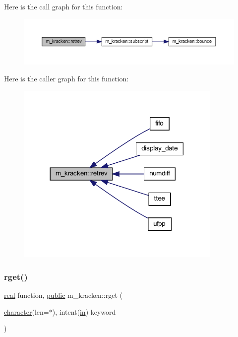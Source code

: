 Here is the call graph for this function\+:
\nopagebreak
\begin{figure}[H]
\begin{center}
\leavevmode
\includegraphics[width=350pt]{namespacem__kracken_ad4f3d7c793c90789b175097b433035da_cgraph}
\end{center}
\end{figure}
Here is the caller graph for this function\+:
\nopagebreak
\begin{figure}[H]
\begin{center}
\leavevmode
\includegraphics[width=281pt]{namespacem__kracken_ad4f3d7c793c90789b175097b433035da_icgraph}
\end{center}
\end{figure}
\mbox{\label{namespacem__kracken_a21e0e40932af79430832a53bdb4de300}} 
\subsubsection{\texorpdfstring{rget()}{rget()}}
{\footnotesize\ttfamily \hyperlink{read__watch_83_8txt_abdb62bde002f38ef75f810d3a905a823}{real} function, \hyperlink{M__stopwatch_83_8txt_a2f74811300c361e53b430611a7d1769f}{public} m\+\_\+kracken\+::rget (\begin{DoxyParamCaption}\item[{\hyperlink{option__stopwatch_83_8txt_abd4b21fbbd175834027b5224bfe97e66}{character}(len=$\ast$), intent(\hyperlink{M__journal_83_8txt_afce72651d1eed785a2132bee863b2f38}{in})}]{keyword }\end{DoxyParamCaption})}



